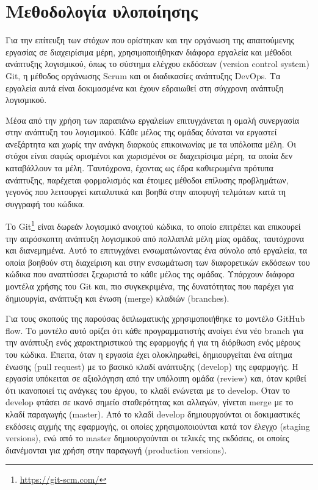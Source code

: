 \section{Μεθοδολογία υλοποίησης} \label{subsection:4-1-implementation-methodology}

Για την επίτευξη των στόχων που ορίστηκαν και την οργάνωση της απαιτούμενης εργασίας σε διαχειρίσιμα μέρη, χρησιμοποιήθηκαν διάφορα εργαλεία και μέθοδοι ανάπτυξης λογισμικού, όπως το σύστημα ελέγχου εκδόσεων (version control system) Git, η μέθοδος οργάνωσης Scrum και οι διαδικασίες ανάπτυξης DevOps. Τα εργαλεία αυτά είναι δοκιμασμένα και έχουν εδραιωθεί στη σύγχρονη ανάπτυξη λογισμικού.

Μέσα από την χρήση των παραπάνω εργαλείων επιτυγχάνεται η ομαλή συνεργασία στην ανάπτυξη του λογισμικού. Κάθε μέλος της ομάδας δύναται να εργαστεί ανεξάρτητα και χωρίς την ανάγκη διαρκούς επικοινωνίας με τα υπόλοιπα μέλη. Οι στόχοι είναι σαφώς ορισμένοι και χωρισμένοι σε διαχειρίσιμα μέρη, τα οποία δεν καταβάλλουν τα μέλη. Ταυτόχρονα, έχοντας ως έδρα καθιερωμένα πρότυπα ανάπτυξης, παρέχεται φορμαλισμός και έτοιμες μέθοδοι επίλυσης προβλημάτων, γεγονός που λειτουργεί καταλυτικά και βοηθά στην αποφυγή τελμάτων κατά τη συγγραφή του κώδικα.

Το Git\footnote{\url{https://git-scm.com/}} είναι δωρεάν λογισμικό ανοιχτού κώδικα, το οποίο επιτρέπει και επικουρεί την απρόσκοπτη ανάπτυξη λογισμικού από πολλαπλά μέλη μίας ομάδας, ταυτόχρονα και διανεμημένα. Αυτό το επιτυγχάνει ενσωματώνοντας ένα σύνολο από εργαλεία, τα οποία βοηθούν στη διαχείριση και στην ενσωμάτωση των διαφορετικών εκδόσεων του κώδικα που αναπτύσσει ξεχωριστά το κάθε μέλος της ομάδας. Υπάρχουν διάφορα μοντέλα χρήσης του Git και, πιο συγκεκριμένα, της δυνατότητας που παρέχει για δημιουργία, ανάπτυξη και ένωση (merge) κλαδιών (branches).

Για τους σκοπούς της παρούσας διπλωματικής χρησιμοποιήθηκε το μοντέλο GitHub flow\cite{4.1-github-flow}. Το μοντέλο αυτό ορίζει ότι κάθε προγραμματιστής ανοίγει ένα νέο branch για την ανάπτυξη ενός χαρακτηριστικού της εφαρμογής ή για τη διόρθωση ενός μέρους του κώδικα. Έπειτα, όταν η εργασία έχει ολοκληρωθεί, δημιουργείται ένα αίτημα ένωσης (pull request) με το βασικό κλαδί ανάπτυξης (develop) της εφαρμογής. Η εργασία υπόκειται σε αξιολόγηση από την υπόλοιπη ομάδα (review) και, όταν κριθεί ότι ικανοποιεί τις ανάγκες του έργου, το κλαδί ενώνεται με το develop. Όταν το develop φτάσει σε ικανό σημείο σταθερότητας και αλλαγών, γίνεται merge με το κλαδί παραγωγής (master). Από το κλαδί develop δημιουργούνται οι δοκιμαστικές εκδόσεις αιχμής της εφαρμογής, οι οποίες χρησιμοποιούνται κατά τον έλεγχο (staging versions), ενώ από το master δημιουργούνται οι τελικές της εκδόσεις, οι οποίες διανέμονται για χρήση στην παραγωγή (production versions).

